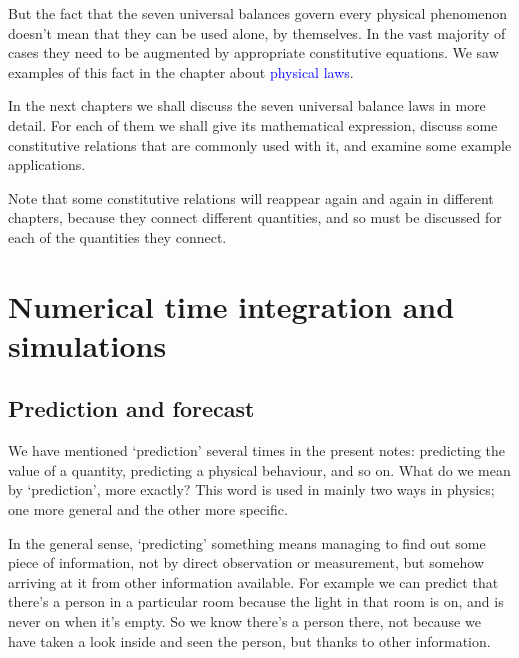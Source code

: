 \documentclass[a4paper,12pt,%
onecolumn,oneside,%
british%
]{memoir}
\renewcommand*{\|}[1][]{\nonscript\:#1\vert\nonscript\:\mathopen{}}
\newcommand*{\sect}{\S}%
\renewcommand*{\autoref}[2]{\sidepar{\vspace{-1ex}\footnotesize{\color{blue}\faIcon{%
angle-right%
}\enspace\sect\,\ref{#1} page\,\pageref{#1}}}\textcolor{blue}{#2}}
\begin{document}
\smallskip


But the fact that the seven universal balances govern every physical phenomenon doesn't mean that they can be used alone, by themselves. In the vast majority of cases they need to be augmented by appropriate constitutive equations. We saw examples of this fact in the chapter about \autoref{cha:laws}{physical laws}.


\bigskip

In the next chapters we shall discuss the seven universal balance laws in more detail. For each of them we shall give its mathematical expression, discuss some constitutive relations that are commonly used with it, and examine some example applications.

Note that some constitutive relations will reappear again and again in different chapters, because they connect different quantities, and so must be discussed for each of the quantities they connect.



\section{Numerical time integration and simulations}
\label{sec:numeric_simulation}


\subsection{Prediction and forecast}
\label{sec:forecast}

We have mentioned \enquote*{prediction} several times in the present notes: predicting the value of a quantity, predicting a physical behaviour, and so on. What do we mean by \enquote*{prediction}, more exactly? This word is used in mainly two ways in physics; one more general and the other more specific.

In the general sense, \enquote*{predicting} something means managing to find out some piece of information, not by direct observation or measurement, but somehow arriving at it from other information available. For example we can predict that there's a person in a particular room because the light in that room is on, and is never on when it's empty. So we know there's a person there, not because we have taken a look inside and seen the person, but thanks to other information.
\end{document}
